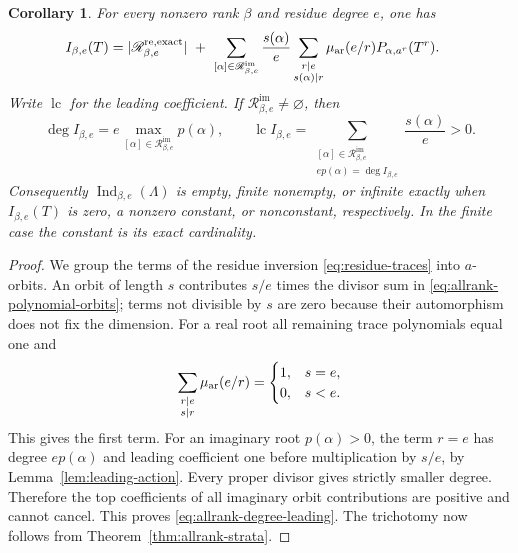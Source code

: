 \documentclass[11pt, reqno]{amsart}
\numberwithin{equation}{section}
\newtheorem{corollary}[theorem]{Corollary}
\theoremstyle{definition}
\theoremstyle{remark}
\newcommand{\op}[1]{\operatorname{#1}}
\newcommand{\mr}[1]{\mathrm{#1}}
\newcommand{\ms}[1]{\mathscr{#1}}
\newcommand{\Ind}{\op{Ind}}
\begin{document}
\begin{corollary}\label{cor:allrank-polynomial-strata}
For every nonzero rank $\beta$ and residue degree $e$, one has
\begin{align}
 I_{\beta,e}(T)
 &=|\ms R^{\mr{re,exact}}_{\beta,e}|\ +\ \sum_{[\alpha]\in\ms R^{\mr{im}}_{\beta,e}}
   \frac{s(\alpha)}e
   \sum_{\substack{r\mid e\\s(\alpha)\mid r}}
      \mu_{\rm ar}(e/r)P_{\alpha,a^r}(T^r).
       \label{eq:allrank-polynomial-orbits}
\end{align}
Write $\op{lc}$ for the leading coefficient. If
$\ms R^{\mr{im}}_{\beta,e}\ne\varnothing$, then
\begin{equation}\label{eq:allrank-degree-leading}
 \deg I_{\beta,e}=e\max_{[\alpha]\in\ms R^{\mr{im}}_{\beta,e}}
                          p(\alpha),\qquad
 \op{lc} I_{\beta,e}
   =\sum_{\substack{[\alpha]\in\ms R^{\mr{im}}_{\beta,e}\\
              e p(\alpha)=\deg I_{\beta,e}}}\frac{s(\alpha)}e>0.
\end{equation}
Consequently $\Ind_{\beta,e}(\Lambda)$ is empty, finite nonempty,
or infinite exactly when $I_{\beta,e}(T)$ is zero, a nonzero
constant, or nonconstant, respectively. In the finite case the
constant is its exact cardinality.
\end{corollary}
\begin{proof}
We group the terms of the residue inversion
\eqref{eq:residue-traces} into $a$-orbits. An orbit of length $s$
contributes $s/e$ times the divisor sum in
\eqref{eq:allrank-polynomial-orbits}; terms not divisible by $s$
are zero because their automorphism does not fix the dimension.
For a real root all remaining trace polynomials equal one and
\[
\sum_{\substack{r\mid e\\s\mid r}}\mu_{\rm ar}(e/r)
                       =\begin{cases}1,&s=e,\\0,&s<e.\end{cases}
\]
This gives the first term. For an imaginary root $p(\alpha)>0$,
the term $r=e$ has degree $e p(\alpha)$ and leading coefficient
one before multiplication by $s/e$, by Lemma~\ref{lem:leading-action}. Every proper divisor gives
strictly smaller degree. Therefore the top coefficients of
all imaginary orbit contributions are positive and cannot cancel.
This proves \eqref{eq:allrank-degree-leading}. The trichotomy
now follows from Theorem~\ref{thm:allrank-strata}.
\end{proof}
\end{document}
